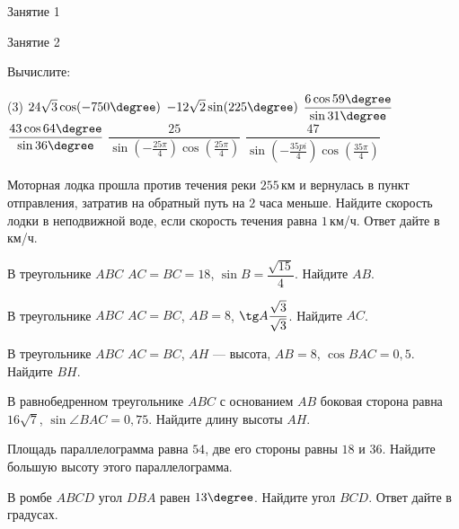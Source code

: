 %
%

\begin{class}[number=1]
	\begin{listofex}
		\item Занятие 1
	\end{listofex}
\end{class}

\begin{class}[number=2]
	\begin{listofex}
		\item Занятие 2
	\end{listofex}
\end{class}

\begin{homework}[number=1]
	\begin{listofex}
		\item Вычислите:
		\begin{tasks}(3)
			\task \( 24\sqrt{3}\cos(-750\degree) \)
			\task \( -12\sqrt{2}\sin(225\degree) \)
			\task \( \dfrac{6\cos59\degree}{\sin31\degree} \)
			\task \( \dfrac{43\cos64\degree}{\sin36\degree} \)
			\task \( \dfrac{25}{\sin\left( -\frac{25\pi}{4} \right)\cos\left( \frac{25\pi}{4} \right)} \)
			\task \( \dfrac{47}{\sin\left( -\frac{35pi}{4} \right)\cos\left( \frac{35\pi}{4} \right)} \)
		\end{tasks}
		\item Моторная лодка прошла против течения реки \( 255 \) км и вернулась в пункт отправления, затратив на обратный путь на \( 2 \) часа меньше. Найдите скорость лодки в неподвижной воде, если скорость течения равна \( 1 \) км/ч. Ответ дайте в км/ч.
		\item В треугольнике \( ABC \) \( AC=BC=18 \), \( \sin B=\dfrac{\sqrt{15}}{4} \). Найдите \( AB \).
		\item В треугольнике \( ABC \) \( AC=BC \), \( AB=8 \), \( \tg A\dfrac{\sqrt{3}}{\sqrt{3}} \).  Найдите \( AC \).
		\item В треугольнике \( ABC \) \( AC=BC \), \( AH \) --- высота, \( AB=8 \), \( \cos BAC=0,5 \). Найдите \( BH \).
		\item В равнобедренном треугольнике \( ABC \) с основанием \( AB \) боковая сторона равна \( 16\sqrt{7} \), \( \sin\angle BAC=0,75 \). Найдите длину высоты \( AH \).
		\item Площадь параллелограмма равна \( 54 \), две его стороны равны \( 18 \) и \( 36 \). Найдите большую высоту этого параллелограмма.
		\item В ромбе \( ABCD \) угол \( DBA \) равен \( 13\degree \). Найдите угол \( BCD \). Ответ дайте в градусах.
	\end{listofex}
\end{homework}

